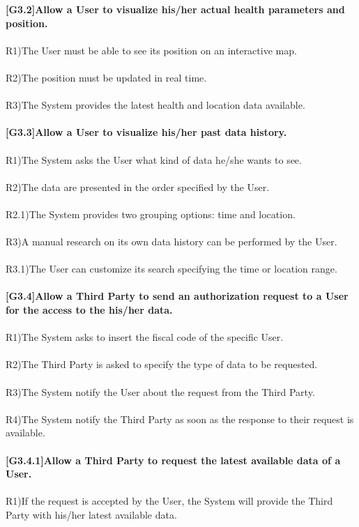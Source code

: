 \textbf{ [G3.2]Allow a User to visualize his/her actual health parameters and position.} \\ \\
R1)The User must be able to see its position on an interactive map. \\ \\
R2)The position must be updated in real time. \\ \\
R3)The System provides the latest health and location data available. \\ \\

\textbf{[G3.3]Allow a User to visualize his/her past data history.} \\ \\
R1)The System asks the User what kind of data he/she wants to see. \\ \\
R2)The data are presented in the order specified by the User.  \\ \\
R2.1)The System provides two grouping options: time and location. \\ \\
R3)A manual research on its own data history can be performed by the User. \\ \\
R3.1)The User can customize its search specifying the time or location range. \\ \\ 

\textbf{[G3.4]Allow a Third Party to send an authorization request to a User for the access to the his/her data.} \\ \\
R1)The System asks to insert the fiscal code of the specific User. \\ \\
R2)The Third Party is asked to specify the type of data to be requested.\\ \\ 
R3)The System notify the User about the request from the Third Party.\\ \\
R4)The System notify the Third Party as soon as the response to their request is available. \\ \\

\textbf{[G3.4.1]Allow a Third Party to request the latest available data of a User.} \\ \\
R1)If the request is accepted by the User, the System will provide the Third Party with his/her latest available data. \\ \\ 

